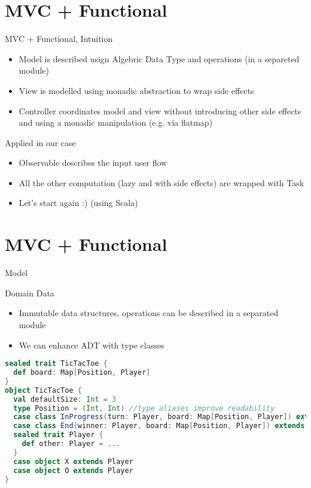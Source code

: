 \documentclass[presentation]{beamer}
\begin{document}
\section{MVC + Functional}
\begin{frame}[fragile]{MVC + Functional, Intuition}
\begin{itemize}
  \item Model is described usign Algebric Data Type and operations (in a separeted module)
  \item View is modelled using monadic abstraction to wrap side effects
  \item Controller coordinates model and view without introducing other side effects and using a monadic manipulation (e.g. via flatmap)
\end{itemize}


\begin{block}{Applied in our case}
\begin{itemize}
  \item Observable describes the input user flow
  \item All the other computation (lazy and with side effects) are wrapped with Task
  \item Let's start again :) (using Scala)
\end{itemize}
\end{block}

\end{frame}

\section{MVC + Functional}
\begin{frame}[fragile]{Model}

\begin{block}{Domain Data}
\begin{itemize}
  \item Immutable data structures, operations can be described in a separated module
  \item We can enhance ADT with type classes
\end{itemize}
\end{block}

\begin{lstlisting}[language=scala]
sealed trait TicTacToe {
  def board: Map[Position, Player]
}
object TicTacToe {
  val defaultSize: Int = 3
  type Position = (Int, Int) //type aliases improve readability
  case class InProgress(turn: Player, board: Map[Position, Player]) extends TicTacToe
  case class End(winner: Player, board: Map[Position, Player]) extends TicTacToe
  sealed trait Player {
    def other: Player = ...
  }
  case object X extends Player
  case object O extends Player
}
\end{lstlisting}

\end{frame}
\end{document}
